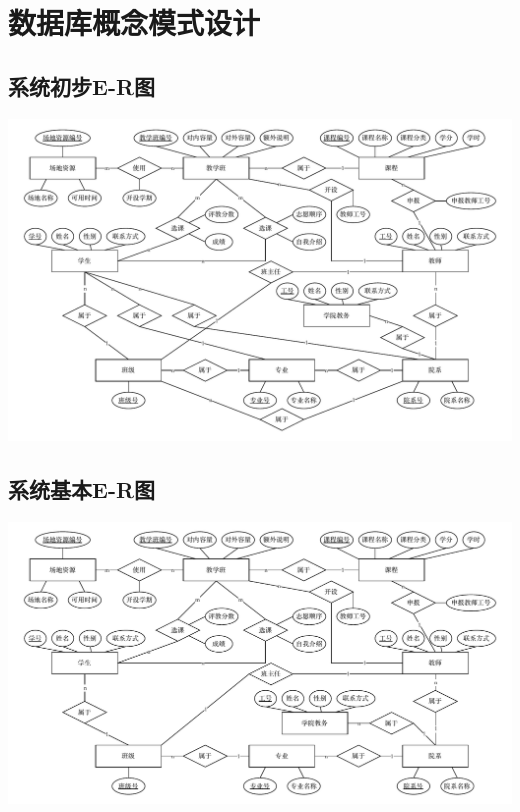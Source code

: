 \section{数据库概念模式设计}
\subsection{系统初步E-R图}
\begin{center}
    \includegraphics[scale=0.65]{img/conceptional_schema/er_preliminary}
\end{center}
\subsection{系统基本E-R图}
\begin{center}
    \includegraphics[scale=0.65]{img/conceptional_schema/er}
\end{center}
